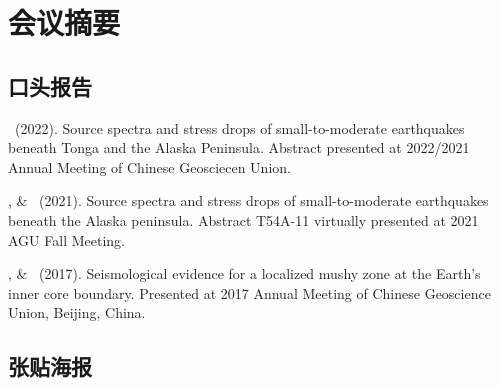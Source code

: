 \section{会议摘要}

\subsection{口头报告}

\begin{etaremune}
\item \Me\ (2022).
	Source spectra and stress drops of small-to-moderate earthquakes beneath Tonga and the Alaska Peninsula.
	Abstract presented at 2022/2021 Annual Meeting of Chinese Geosciecen Union.
\item \Me, \& \SWei\ (2021).
    Source spectra and stress drops of small-to-moderate earthquakes beneath the Alaska peninsula.
    Abstract T54A-11 virtually presented at 2021 AGU Fall Meeting.
\item
    \Me, \& \LWen\ (2017).
    Seismological evidence for a localized mushy zone at the Earth's inner core boundary.
    Presented at 2017 Annual Meeting of Chinese Geoscience Union, Beijing, China.
\end{etaremune}

\subsection{张贴海报}

